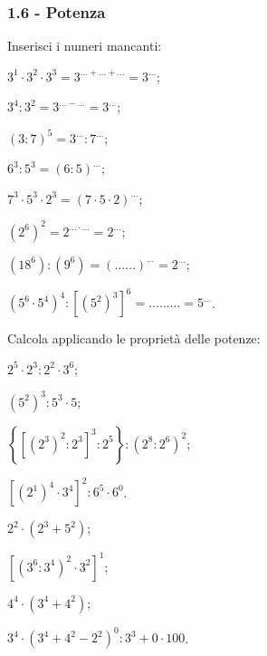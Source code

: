 \subsubsection*{1.6 - Potenza}
\begin{esercizio}
\label{ese:1.10}
Inserisci i numeri mancanti:
 \begin{multicols}{2}
 \begin{enumeratea}
 \item $3^1\cdot3^2\cdot3^3=3^{\ldots+\ldots+\ldots}=3^{\ldots}$;
 \item $3^4:3^2=3^{\ldots-\ldots}=3^{\ldots}$;
 \item $(3:7)^5=3^{\ldots}:7^{\ldots}$;
 \item $6^3:5^3=(6:5)^{\ldots}$;
 \item $7^3\cdot5^3\cdot2^3=(7\cdot 5 \cdot 2)^{\ldots}$;
 \item $\left(2^6\right)^2=2^{\ldots\cdot\ldots}=2^{\ldots}$;
 \item $\left(18^6\right):\left(9^6\right)=(\ldots\ldots)^{\ldots}=2^{\ldots}$;
 \item $\left(5^6\cdot5^4\right)^4:\left[\left(5^2\right)^3\right]^6=\ldots\ldots\ldots=5^{\ldots}$.
 \end{enumeratea}

 \end{multicols}
\end{esercizio}

\begin{esercizio}[\Ast]
\label{ese:1.11}
Calcola applicando le proprietà delle potenze:
 \begin{multicols}{2}
 \begin{enumeratea}
 \item $2^5\cdot2^3:2^2\cdot3^6$;
 \item $\left(5^2\right)^3:5^3\cdot5$;
 \item $\left\{\left[\left(2^3\right)^2:2^3\right]^3:2^5\right\}:\left(2^8:2^6\right)^2$;
 \item $\left[\left(2^1\right)^4\cdot 3^4\right]^2:6^5\cdot6^0$.
 \item $2^2\cdot\left(2^3+5^2\right)$;
 \item $\left[\left(3^6:3^4\right)^2\cdot3^2\right]^1$;
 \item $4^4\cdot\left(3^4+4^2\right)$;
 \item $3^4\cdot\left(3^4+4^2-2^2\right)^0:3^3+0\cdot 100$.
 \end{enumeratea}
 \end{multicols}
\end{esercizio}

